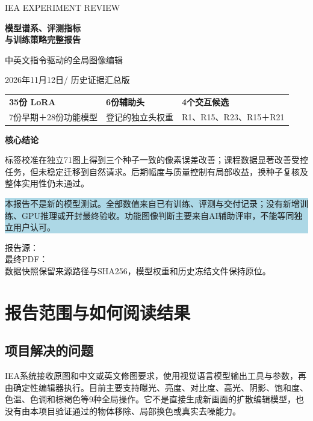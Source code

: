 \documentclass[UTF8,fontset=none,zihao=5,a4paper]{ctexart}
\newcommand{\note}[1]{\par\smallskip\noindent\colorbox{lightblue}{\parbox{\dimexpr\linewidth-2\fboxsep}{\small #1}}\par\smallskip}
\begin{document}
\hypersetup{pageanchor=false}
\begin{titlepage}
\vspace*{12mm}
{\sffamily\color{teal}\Large IEA EXPERIMENT REVIEW\par}
\vspace{10mm}
{\sffamily\bfseries\color{navy}\fontsize{29}{38}\selectfont 模型谱系、评测指标\\与训练策略完整报告\par}
\vspace{8mm}
{\Large 中英文指令驱动的全局图像编辑\par}
\vspace{6mm}
{\color{muted}2026年11月12日\quad / \quad 历史证据汇总版\par}
\vspace{14mm}
\noindent\begin{tabularx}{\linewidth}{@{}YYY@{}}
\toprule
\textbf{35份 LoRA} & \textbf{6份辅助头} & \textbf{4个交互候选}\\
7份早期＋28份功能模型 & 登记的独立头权重 & R1、R15、R23、R15＋R21\\
\bottomrule
\end{tabularx}
\vspace{10mm}
\noindent\textbf{核心结论}\par
标签校准在独立71图上得到三个种子一致的像素误差改善；课程数据显著改善受控任务，但未稳定迁移到自然请求。后期幅度与质量控制有局部收益，换种子复核及整体实用性仍未通过。
\vspace{6mm}
\note{本报告不是新的模型测试。全部数值来自已有训练、评测与交付记录；没有新增训练、GPU推理或开封最终验收。功能图像判断主要来自AI辅助评审，不能等同独立用户认可。}
\vfill
\noindent\small 报告源：\\
最终PDF：\\
数据快照保留来源路径与SHA256，模型权重和历史冻结文件保持原位。
\end{titlepage}
\hypersetup{pageanchor=true}
\begingroup
\small\linespread{1.0}\selectfont
\setlength{\parskip}{0pt}
\tableofcontents
\endgroup
\clearpage
{}

\section{报告范围与如何阅读结果}
\subsection{项目解决的问题}
IEA系统接收原图和中文或英文修图要求，使用视觉语言模型输出工具与参数，再由确定性编辑器执行。目前主要支持曝光、亮度、对比度、高光、阴影、饱和度、色温、色调和棕褐色等9种全局操作。它不是直接生成新画面的扩散编辑模型，也没有由本项目验证通过的物体移除、局部换色或真实去噪能力。
\end{document}
